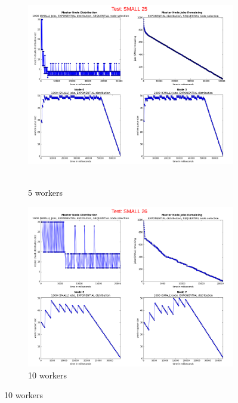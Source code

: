 \documentclass{article}
\begin{document}
\begin{figure}[p] 
  \begin{subfigure}[b]{0.5\linewidth}
    \centering
    \hbox{\hspace{-5.0em} \includegraphics[width=1.2\linewidth]{combined_small_growing_workers_exp/case_small_25} }
    \caption{5 workers}
    \label{testExpSmall5} 
    \vspace{4ex}
  \end{subfigure}%
  \begin{subfigure}[b]{0.5\linewidth}
    \centering
    \includegraphics[width=1.2\linewidth]{combined_small_growing_workers_exp/case_small_26} 
    \caption{10 workers} 
    \label{testExpSmall10} 
    \vspace{4ex}
  \end{subfigure} 
  

\end{figure}
\end{document}

